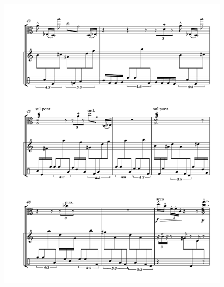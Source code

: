 \begin{figure}[htbp]
    \centering
	\includegraphics[width=6.5in]{figures/Viola_Percussion_7.pdf}
\end{figure}

